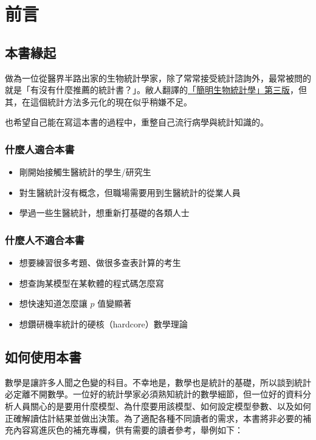 \chapter{前言}

\section{本書緣起}
做為一位從醫界半路出家的生物統計學家，除了常常接受統計諮詢外，最常被問的就是「有沒有什麼推薦的統計書？」。敝人翻譯的\href{https://hochitw.com/index_down.php?ISPID=12350&sele=shopbig_dm_down}{「簡明生物統計學」第三版}，但其，在這個統計方法多元化的現在似乎稍嫌不足。

也希望自己能在寫這本書的過程中，重整自己流行病學與統計知識的。

\subsection{什麼人適合本書}
\begin{itemize}
    \item 剛開始接觸生醫統計的學生/研究生
    \item 對生醫統計沒有概念，但職場需要用到生醫統計的從業人員
    \item 學過一些生醫統計，想重新打基礎的各類人士
\end{itemize}

\subsection{什麼人不適合本書}
\begin{itemize}
    \item 想要練習很多考題、做很多查表計算的考生
    \item 想查詢某模型在某軟體的程式碼怎麼寫
    \item 想快速知道怎麼讓 $p$ 值變顯著
    \item 想鑽研機率統計的硬核（hardcore）數學理論
\end{itemize}

\section{如何使用本書}

數學是讓許多人聞之色變的科目。不幸地是，數學也是統計的基礎，所以談到統計必定離不開數學。一位好的統計學家必須熟知統計的數學細節，但一位好的資料分析人員關心的是要用什麼模型、為什麼要用該模型、如何設定模型參數、以及如何正確解讀估計結果並做出決策。為了適配各種不同讀者的需求，本書將非必要的補充內容寫進灰色的補充專欄，供有需要的讀者參考，舉例如下：

